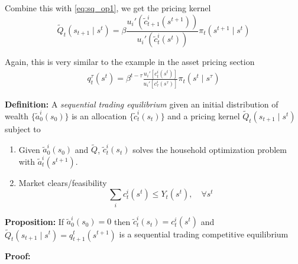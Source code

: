 \documentclass[twocolumn, fleqn]{article}
\numberwithin{equation}{section}
\begin{document}
	Combine this with \eqref{eq:sq_op1}, we get the pricing kernel
	\begin{equation}
		\tilde{Q}_t(s_{t+1} \mid s^t) 
= \beta \frac{u_i'\left( \tilde{c}_{t+1}^i(s^{t+1}) \right)}{u_i'\left( \tilde{c}_t^i(s^t) \right)} \pi_t(s^{t+1} \mid s^t) \label{eq:se_pkernel}
	\end{equation}
	
	Again, this is very similar to the example in the asset pricing section
	\begin{align*}
		q_t^\tau(s^t)= \beta^{t - \tau} \frac{u_i'\left[c_t^i(s^t)\right]}{u_i'\left[c_\tau^i(s^\tau)\right]} \pi_t(s^t \mid s^\tau)
	\end{align*}
	
	\textbf{Definition:} A \textit{sequential trading equilibrium} given an initial distribution of wealth $\{\tilde a_0^i (s_0)\}$ is an allocation $\{\tilde c_t^i (s_t)\}$ and a pricing kernel $\tilde{Q}_t(s_{t+1} \mid s^t)$ subject to 
	\begin{enumerate}
		\item Given $\tilde a_0^i (s_0)$ and $\tilde Q$, $\tilde c_t^i (s_t)$ solves the household optimization problem with $\tilde a_t^i (s^{t+1})$.
		\item Market clears/feasibility \[ \sum_i c_t^i(s^t) \leq Y_t(s^t),\quad \forall s^t\]
	\end{enumerate}
	
	\textbf{Proposition:} If $\tilde a_0^i (s_0)=0$ then $\tilde c_t^i (s_t)=c_t^i(s^t)$ and $\tilde{Q}_t(s_{t+1} \mid s^t) = q_{t+1}^{t}(s^{t+1})$ is a sequential trading competitive equilibrium
	
	\textbf{Proof:} 	
	
	
	
	

	
\end{document}
